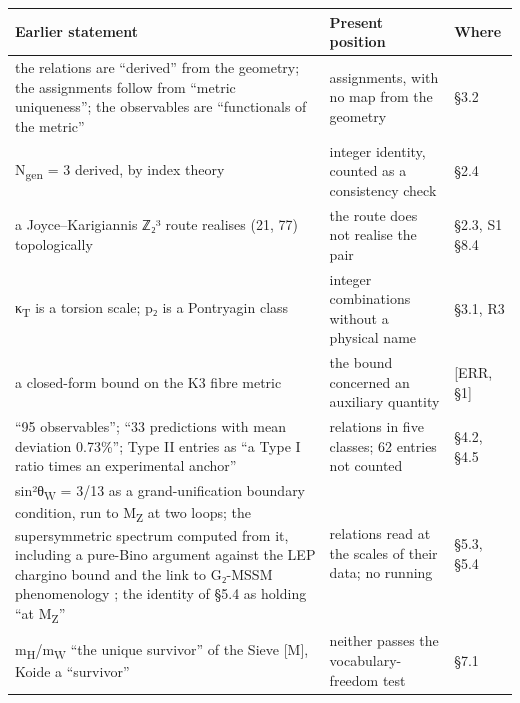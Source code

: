 \documentclass[11pt,a4paper]{article}
\begin{document}
\begin{longtable}[]{@{}
  >{\raggedright\arraybackslash}p{}
  >{\raggedright\arraybackslash}p{}
  >{\raggedright\arraybackslash}p{}@{}}
\toprule\noalign{}
\begin{minipage}[b]{\linewidth}\raggedright
Earlier statement
\end{minipage} & \begin{minipage}[b]{\linewidth}\raggedright
Present position
\end{minipage} & \begin{minipage}[b]{\linewidth}\raggedright
Where
\end{minipage} \\
\midrule\noalign{}
\endhead
\bottomrule\noalign{}
\endlastfoot
the relations are ``derived'' from the geometry; the assignments follow from ``metric uniqueness''; the observables are ``functionals of the metric'' & assignments, with no map from the geometry & §3.2 \\
N\textsubscript{gen} = 3 derived, by index theory & integer identity, counted as a consistency check & §2.4 \\
a Joyce--Karigiannis ℤ₂³ route \cite{43} realises (21, 77) topologically & the route does not realise the pair & §2.3, S1 §8.4 \\
κ\textsubscript{T} is a torsion scale; p₂ is a Pontryagin class & integer combinations without a physical name & §3.1, R3 \\
a closed-form bound on the K3 fibre metric & the bound concerned an auxiliary quantity & {[}ERR, §1{]} \\
``95 observables''; ``33 predictions with mean deviation 0.73\%''; Type II entries as ``a Type I ratio times an experimental anchor'' & 33 relations in five classes; 62 entries not counted & §4.2, §4.5 \\
sin²θ\textsubscript{W} = 3/13 as a grand-unification boundary condition, run to M\textsubscript{Z} at two loops; the supersymmetric spectrum computed from it, including a pure-Bino argument against the LEP chargino bound \cite{46} and the link to G₂-MSSM phenomenology \cite{33}; the identity of §5.4 as holding ``at M\textsubscript{Z}'' & relations read at the scales of their data; no running & §5.3, §5.4 \\
m\textsubscript{H}/m\textsubscript{W} ``the unique survivor'' of the Sieve {[}M{]}, Koide a ``survivor'' & neither passes the vocabulary-freedom test & §7.1 \\

\end{longtable}
\end{document}
